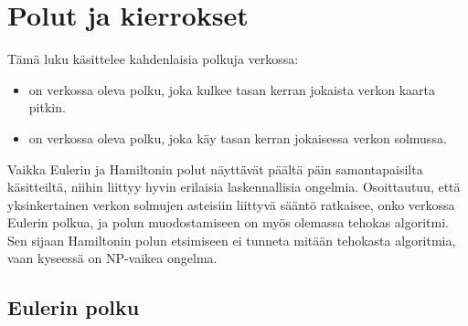 \chapter{Polut ja kierrokset}

Tämä luku käsittelee kahdenlaisia polkuja verkossa:
\begin{itemize}
\item {} on verkossa oleva
polku, joka kulkee tasan kerran jokaista
verkon kaarta pitkin.
\item {} on verkossa
oleva polku, joka käy tasan kerran
jokaisessa verkon solmussa.
\end{itemize}
Vaikka Eulerin ja Hamiltonin polut
näyttävät päältä päin
samantapaisilta käsitteiltä,
niihin liittyy hyvin erilaisia laskennallisia ongelmia.
Osoittautuu, että yksinkertainen verkon solmujen
asteisiin liittyvä sääntö ratkaisee, onko verkossa
Eulerin polkua, ja polun muodostamiseen on myös
olemassa tehokas algoritmi.
Sen sijaan Hamiltonin polun etsimiseen ei tunneta
mitään tehokasta algoritmia, vaan kyseessä on
NP-vaikea ongelma.

\section{Eulerin polku}


